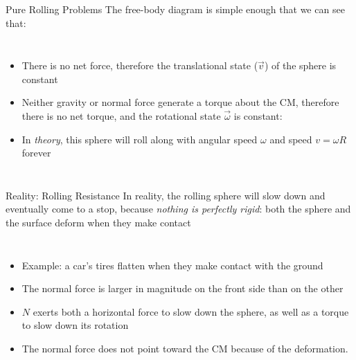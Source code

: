 \documentclass[12pt,compress,aspectratio=169]{beamer}
\begin{document}
\begin{frame}{Pure Rolling Problems}
  The free-body diagram is simple enough that we can see that:
  \begin{columns}
    \begin{itemize}
    \item There is no net force, therefore the translational state ($\vec v$)
      of the sphere is constant

    \item Neither gravity or normal force generate a torque about the CM,
      therefore there is no net torque, and the rotational state $\vec\omega$
      is constant:

    \item In \emph{theory}, this sphere will roll along with
      angular speed $\omega$ and speed $v=\omega R$ forever
    \end{itemize}

  \end{columns}
\end{frame}



\begin{frame}{Reality: Rolling Resistance}
  In reality, the rolling sphere will slow down and eventually come to a stop,
  because \emph{nothing is perfectly rigid}: both the sphere and the surface
  deform when they make contact
  \begin{columns}
    \begin{itemize}
    \item Example: a car's tires flatten when they make contact with the ground
    \item The normal force is larger in magnitude on the front side than on the
      other
    \item $N$ exerts both a horizontal force to slow down the sphere, as well
      as a torque to slow down its rotation
    \item The normal force does not point toward the CM because of the
      deformation.
    \end{itemize}

    \vspace{.3in}
  \end{columns}
\end{frame}
\end{document}
